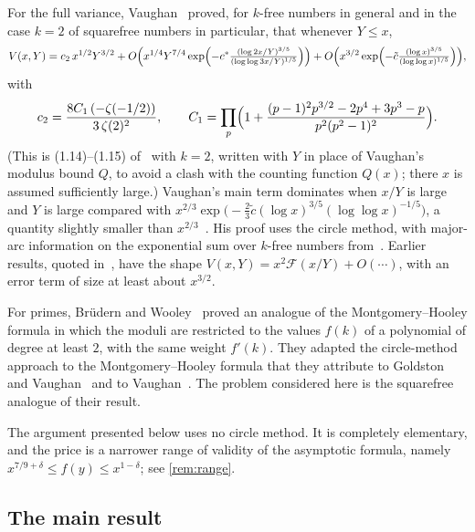 For the full variance, Vaughan~\cite[Theorem, (1.12)--(1.15)]{Vaughan2005} proved, for $k$-free numbers in general and in the case $k=2$ of squarefree numbers in particular, that whenever $Y\le x$,
\[
V(x,Y)=c_2\,x^{1/2}Y^{3/2}+O\Bigl(x^{1/4}Y^{7/4}\exp\Bigl(-c^*\tfrac{(\log 2x/Y)^{3/5}}{(\log\log 3x/Y)^{1/5}}\Bigr)\Bigr)+O\Bigl(x^{3/2}\exp\Bigl(-\tilde c\tfrac{(\log x)^{3/5}}{(\log\log x)^{1/5}}\Bigr)\Bigr),
\]
with
\begin{equation}\label{eq:vaughan-c2}
c_2=\frac{8C_1\,(-\zeta(-1/2))}{3\,\zeta(2)^2},\qquad
C_1=\prod_p\Bigl(1+\frac{(p-1)^2p^{3/2}-2p^4+3p^3-p}{p^2(p^2-1)^2}\Bigr).
\end{equation}
(This is (1.14)--(1.15) of~\cite{Vaughan2005} with $k=2$, written with $Y$ in place of Vaughan's modulus bound $Q$, to avoid a clash with the counting function $Q(x)$; there $x$ is assumed sufficiently large.) Vaughan's main term dominates when $x/Y$ is large and $Y$ is large compared with $x^{2/3}\exp\bigl(-\tfrac23\tilde c(\log x)^{3/5}(\log\log x)^{-1/5}\bigr)$, a quantity slightly smaller than $x^{2/3}$~\cite[(1.16)]{Vaughan2005}. His proof uses the circle method, with major-arc information on the exponential sum over $k$-free numbers from~\cite{BGPVW1998}. Earlier results, quoted in~\cite[(1.6)--(1.11)]{Vaughan2005}, have the shape $V(x,Y)=x^2\mathcal F(x/Y)+O(\cdots)$, with an error term of size at least about $x^{3/2}$.

For primes, Brüdern and Wooley~\cite{BruedernWooley2011} proved an analogue of the Montgomery--Hooley formula in which the moduli are restricted to the values $f(k)$ of a polynomial of degree at least $2$, with the same weight $f'(k)$. They adapted the circle-method approach to the Montgomery--Hooley formula that they attribute to Goldston and Vaughan~\cite{GoldstonVaughan1997} and to Vaughan~\cite{Vaughan1998I}. The problem considered here is the squarefree analogue of their result.

The argument presented below uses no circle method. It is completely elementary, and the price is a narrower range of validity of the asymptotic formula, namely $x^{7/9+\delta}\le f(y)\le x^{1-\delta}$; see \cref{rem:range}.

\subsection{The main result}

